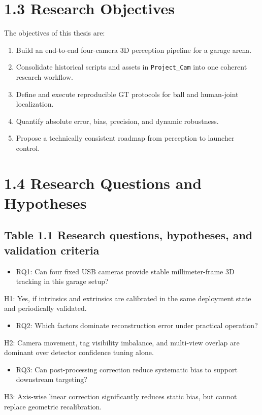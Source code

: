 \section{1.3 Research Objectives}
The objectives of this thesis are:
\begin{enumerate}
  \item Build an end-to-end four-camera 3D perception pipeline for a garage arena.
  \item Consolidate historical scripts and assets in \texttt{Project\_Cam} into one coherent research workflow.
  \item Define and execute reproducible GT protocols for ball and human-joint localization.
  \item Quantify absolute error, bias, precision, and dynamic robustness.
  \item Propose a technically consistent roadmap from perception to launcher control.
\end{enumerate}

\section{1.4 Research Questions and Hypotheses}
\subsection{Table 1.1 Research questions, hypotheses, and validation criteria}

\begin{itemize}
  \item RQ1: Can four fixed USB cameras provide stable millimeter-frame 3D tracking in this garage setup?
\end{itemize}
  H1: Yes, if intrinsics and extrinsics are calibrated in the same deployment state and periodically validated.

\begin{itemize}
  \item RQ2: Which factors dominate reconstruction error under practical operation?
\end{itemize}
  H2: Camera movement, tag visibility imbalance, and multi-view overlap are dominant over detector confidence tuning alone.

\begin{itemize}
  \item RQ3: Can post-processing correction reduce systematic bias to support downstream targeting?
\end{itemize}
  H3: Axis-wise linear correction significantly reduces static bias, but cannot replace geometric recalibration.

